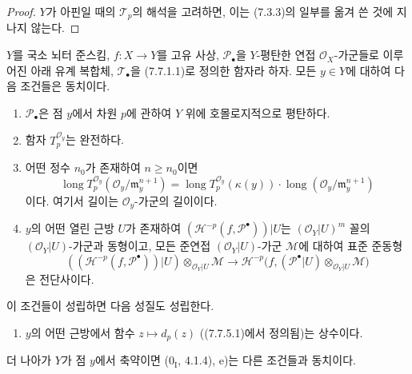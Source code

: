 \begin{proof}
$Y$가 아핀일 때의 $\mathscr T_p$의 해석을 고려하면, 이는 (7.3.3)의
일부를 옮겨 쓴 것에 지나지 않는다.
\end{proof}

\begin{proposition}[7.8.4]
$Y$를 국소 뇌터 준스킴, $f:X\to Y$를 고유 사상,
$\mathscr P_\bullet$을 $Y$-평탄한 연접 $\mathscr O_X$-가군들로 이루어진
아래 유계 복합체, $\mathscr T_\bullet$을 (7.7.1.1)로 정의한 함자라 하자.
모든 $y\in Y$에 대하여 다음 조건들은 동치이다.
\begin{enumerate}
  \item[a)] $\mathscr P_\bullet$은 점 $y$에서 차원 $p$에 관하여 $Y$
    위에 호몰로지적으로 평탄하다.
  \item[b)] 함자 $T_p^{\mathscr O_y}$는 완전하다.
  \item[c)] 어떤 정수 $n_0$가 존재하여 $n\geq n_0$이면
    \[
      \operatorname{long}T_p^{\mathscr O_y}
        (\mathscr O_y/\mathfrak m_y^{n+1})
      =
      \operatorname{long}T_p^{\mathscr O_y}(\kappa(y))
      \cdot
      \operatorname{long}(\mathscr O_y/\mathfrak m_y^{n+1})
      \tag{7.8.4.1}\label{III.7.8.4.1.fr}
    \]
    이다. 여기서 길이는 $\mathscr O_y$-가군의 길이이다.
  \item[d)] $y$의 어떤 열린 근방 $U$가 존재하여
    $(\mathscr H^{-p}(f,\mathscr P^\bullet))|U$는
    $(\mathscr O_Y|U)^m$ 꼴의 $(\mathscr O_Y|U)$-가군과 동형이고, 모든
    준연접 $(\mathscr O_Y|U)$-가군 $\mathscr M$에 대하여 표준 준동형
    \[
      ((\mathscr H^{-p}(f,\mathscr P^\bullet))|U)
      \otimes_{\mathscr O_Y|U}\mathscr M
      \longrightarrow
      \mathscr H^{-p}
      \bigl(
        f,(\mathscr P^\bullet|U)
          \otimes_{\mathscr O_Y|U}\mathscr M
      \bigr)
      \tag{7.8.4.2}\label{III.7.8.4.2.fr}
    \]
    은 전단사이다.
\end{enumerate}
이 조건들이 성립하면 다음 성질도 성립한다.
\begin{enumerate}
  \item[e)] $y$의 어떤 근방에서 함수 $z\mapsto d_p(z)$
    ((7.7.5.1)에서 정의됨)는 상수이다.
\end{enumerate}
더 나아가 $Y$가 점 $y$에서 축약이면 ($0_{\mathrm I}$, 4.1.4), e)는
다른 조건들과 동치이다.
\end{proposition}

